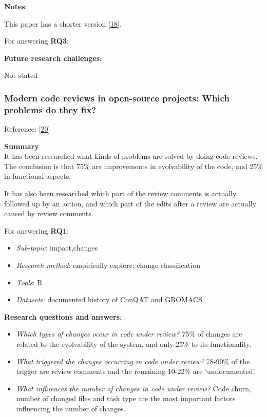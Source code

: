 \documentclass[]{book}
\providecommand{\tightlist}{%
  \setlength{\itemsep}{0pt}\setlength{\parskip}{0pt}}
\begin{document}
\textbf{Notes}:

This paper has a shorter version
{[}\protect\hyperlink{ref-baysal2013influence}{18}{]}.

For answering \textbf{RQ3}:

\textbf{Future research challenges}:

Not stated

\subsubsection{Modern code reviews in open-source projects: Which
problems do they
fix?}\label{modern-code-reviews-in-open-source-projects-which-problems-do-they-fix}

Reference: {[}\protect\hyperlink{ref-beller2014modern}{20}{]}

\textbf{Summary}\\
It has been researched what kinds of problems are solved by doing code
reviews. The conclusion is that 75\% are improvements in evolvability of
the code, and 25\% in functional aspects.

It has also been researched which part of the review comments is
actually followed up by an action, and which part of the edits after a
review are actually caused by review comments.

For answering \textbf{RQ1}:

\begin{itemize}
\tightlist
\item
  \emph{Sub-topic}: impact,changes
\item
  \emph{Research method}: empirically explore; change classification
\item
  \emph{Tools}: R
\item
  \emph{Datasets}: documented history of ConQAT and GROMACS
\end{itemize}

\textbf{Research questions and answers}:

\begin{itemize}
\tightlist
\item
  \emph{Which types of changes occur in code under review?} 75\% of
  changes are related to the evolvability of the system, and only 25\%
  to its functionality.
\item
  \emph{What triggered the changes occurring in code under review?}
  78-90\% of the trigger are review comments and the remaining 10-22\%
  are `undocumented'.
\item
  \emph{What influences the number of changes in code under review?}
  Code churn, number of changed files and task type are the most
  important factors influencing the number of changes.
\end{itemize}
\end{document}
